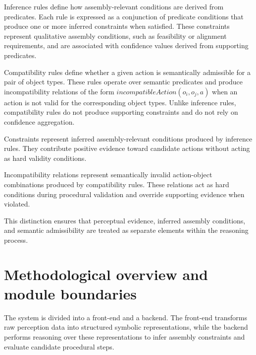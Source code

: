 \documentclass[11pt,titlepage,openright]{book}
\begin{document}
Inference rules define how assembly-relevant conditions are derived from predicates. Each rule is expressed as a conjunction of predicate conditions that produce one or more inferred constraints when satisfied. These constraints represent qualitative assembly conditions, such as feasibility or alignment requirements, and are associated with confidence values derived
from supporting predicates.

Compatibility rules define whether a given action is semantically admissible for a pair of object types. These rules operate over semantic predicates and produce incompatibility relations of the form $incompatibleAction(o_i, o_j, a)$ when an action is not valid for the corresponding object types. Unlike inference rules, compatibility rules do not produce supporting constraints and do not rely on confidence aggregation.

Constraints represent inferred assembly-relevant conditions produced by inference rules. They contribute positive evidence toward candidate actions without acting as hard validity conditions.

Incompatibility relations represent semantically invalid action-object combinations produced by compatibility rules. These relations act as hard conditions during procedural validation and override supporting evidence when violated.

This distinction ensures that perceptual evidence, inferred assembly conditions, and semantic admissibility are treated as separate elements within the reasoning process.


\section{Methodological overview and module boundaries}
\label{sec:method-overview}

The system is divided into a front-end and a backend. The front-end transforms raw perception data into structured symbolic representations, while the backend performs reasoning over these representations to infer assembly constraints and evaluate candidate procedural steps.
\end{document}
